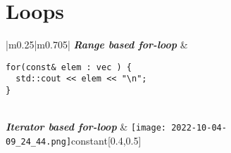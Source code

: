 \documentclass[main.tex,fontsize=8pt,paper=a4,paper=portrait,DIV=calc,]{scrartcl}
\begin{document}
\begin{table}[h!]
\section{Loops}
\begin{tabular}{|m{0.25\linewidth}|m{0.705\linewidth}|}
\hline
\textbf{\emph{Range based for-loop}} &
\vspace{2mm}
\begin{lstlisting}
for(const& elem : vec ) {
  std::cout << elem << "\n";
}
\end{lstlisting}\\
\hline
\textbf{\emph{Iterator based for-loop}}
& 
{\texttt{[image: 2022-10-04-09\_24\_44.png]}\newline constant}[0.4,0.5]\\
\hline
\end{tabular}
\end{table}
\pagebreak
\end{document}
